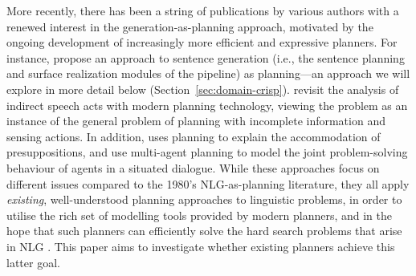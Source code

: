 More recently, there has been a string of publications by various authors with a
renewed interest in the generation-as-planning approach, motivated by the
ongoing development of increasingly more efficient and expressive planners. For
instance, \cite{KolSto07} propose an approach to sentence generation (i.e., the
sentence planning and surface realization modules of the pipeline) as
planning---an approach we will explore in more detail below
(Section~\ref{sec:domain-crisp}). \citet{Steedman-Petrick:07} revisit the
analysis of indirect speech acts with modern planning technology, viewing the
problem as an instance of the general problem of planning with incomplete
information and sensing actions. In addition, \citet{benotti08b} uses planning
to explain the accommodation of presuppositions, and
\citet{brenner08:_contin_multiag_plann_approac_to_situat_dialog} use multi-agent
planning to model the joint problem-solving behaviour of agents in a situated
dialogue. While these approaches focus on different issues compared to the
1980's NLG-as-planning literature, they all apply \emph{existing},
well-understood planning approaches to linguistic problems, in order to utilise
the rich set of modelling tools provided by modern planners, and in the hope
that such planners can efficiently solve the hard search problems that arise in
NLG \citep{KolStr02}. This paper aims to investigate whether existing planners
achieve this latter goal.


